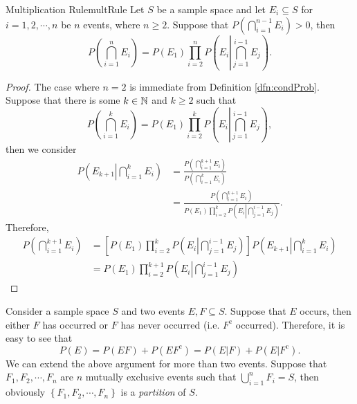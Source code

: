 \documentclass[math]{amznotes}
\theoremstyle{remark}
\newcommand{\0}{\mathbf{0}}
\newcommand{\1}{\mathbf{1}}
\begin{document}
\begin{probox}{Multiplication Rule}{multRule}
    Let $S$ be a sample space and let $E_i \subseteq S$ for $i = 1, 2, \cdots, n$ be $n$ events, where $n \geq 2$. Suppose that $P\left(\bigcap_{i = 1}^{n - 1}E_i\right) > 0$, then 
    \begin{equation*}
        P\left(\bigcap_{i = 1}^{n}E_i\right) = P(E_1)\prod_{i = 2}^{n}P\left(E_i\left\lvert\bigcap_{j = 1}^{i - 1}E_j\right.\right).
    \end{equation*}
    \tcblower
    \begin{proof}
        The case where $n = 2$ is immediate from Definition \ref{dfn:condProb}. Suppose that there is some $k \in \mathbb{N}$ and $k \geq 2$ such that
        \begin{equation*}
            P\left(\bigcap_{i = 1}^{k}E_i\right) = P(E_1)\prod_{i = 2}^{k}P\left(E_i\left\lvert\bigcap_{j = 1}^{i - 1}E_j\right.\right),
        \end{equation*}
        then we consider
        \begin{align*}
            P\left(E_{k + 1}\left\lvert\bigcap_{i = 1}^{k}E_i\right.\right) & = \frac{P\left(\bigcap_{i = 1}^{k + 1}E_i\right)}{P\left(\bigcap_{i = 1}^{k}E_i\right)} \\
            & = \frac{P\left(\bigcap_{i = 1}^{k + 1}E_i\right)}{P(E_1)\prod_{i = 2}^{k}P\left(E_i\left\lvert\bigcap_{j = 1}^{i - 1}E_j\right.\right)}.
        \end{align*}
        Therefore,
        \begin{align*}
            P\left(\bigcap_{i = 1}^{k + 1}E_i\right) & = \left[P(E_1)\prod_{i = 2}^{k}P\left(E_i\left\lvert\bigcap_{j = 1}^{i - 1}E_j\right.\right)\right]P\left(E_{k + 1}\left\lvert\bigcap_{i = 1}^{k}E_i\right.\right) \\
            & = P(E_1)\prod_{i = 2}^{k + 1}P\left(E_i\left\lvert\bigcap_{j = 1}^{i - 1}E_j\right.\right)
        \end{align*}
    \end{proof}
\end{probox}
Consider a sample space $S$ and two events $E, F \subseteq S$. Suppose that $E$ occurs, then either $F$ has occurred or $F$ has never occurred (i.e. $F^{\mathrm{c}}$ occurred). Therefore, it is easy to see that
\begin{equation*}
    P(E) = P(EF) + P(EF^{\mathrm{c}}) = P(E|F) + P(E|F^{\mathrm{c}}).
\end{equation*}
We can extend the above argument for more than two events. Suppose that $F_1, F_2, \cdots, F_n$ are $n$ mutually exclusive events such that $\bigcup_{i = 1}^n F_i = S$, then obviously $\left\{F_1, F_2, \cdots, F_n\right\}$ is a \textit{partition} of $S$.
\end{document}
